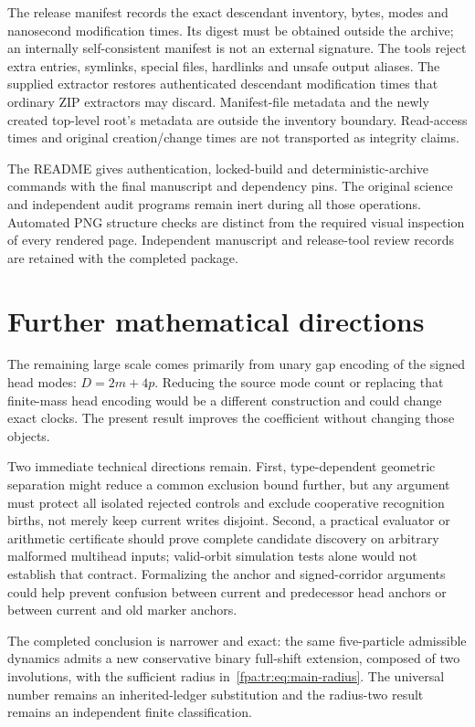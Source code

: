 \documentclass[11pt,a4paper]{article}
\numberwithin{equation}{section}
\begin{document}
The release manifest records the exact descendant inventory, bytes, modes and nanosecond modification times. Its digest must be obtained outside the archive; an internally self-consistent manifest is not an external signature. The tools reject extra entries, symlinks, special files, hardlinks and unsafe output aliases. The supplied extractor restores authenticated descendant modification times that ordinary ZIP extractors may discard. Manifest-file metadata and the newly created top-level root's metadata are outside the inventory boundary. Read-access times and original creation/change times are not transported as integrity claims.

The README gives authentication, locked-build and deterministic-archive commands with the final manuscript and dependency pins. The original science and independent audit programs remain inert during all those operations. Automated PNG structure checks are distinct from the required visual inspection of every rendered page. Independent manuscript and release-tool review records are retained with the completed package.

\section{Further mathematical directions}\label{fpa:rep:70:last}\label{fpa:tr:sec:future}
The remaining large scale comes primarily from unary gap encoding of the signed head modes: $D=2m+4p$. Reducing the source mode count or replacing that finite-mass head encoding would be a different construction and could change exact clocks. The present result improves the coefficient without changing those objects.

Two immediate technical directions remain. First, type-dependent geometric separation might reduce a common exclusion bound further, but any argument must protect all isolated rejected controls and exclude cooperative recognition births, not merely keep current writes disjoint. Second, a practical evaluator or arithmetic certificate should prove complete candidate discovery on arbitrary malformed multihead inputs; valid-orbit simulation tests alone would not establish that contract. Formalizing the anchor and signed-corridor arguments could help prevent confusion between current and predecessor head anchors or between current and old marker anchors.

The completed conclusion is narrower and exact: the same five-particle admissible dynamics admits a new conservative binary full-shift extension, composed of two involutions, with the sufficient radius in~\eqref{fpa:tr:eq:main-radius}. The universal number remains an inherited-ledger substitution and the radius-two result remains an independent finite classification.
\end{document}
